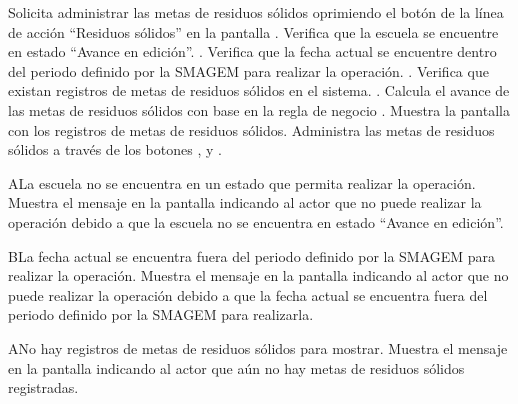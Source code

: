  \begin{UCtrayectoria}
    \UCpaso[\UCactor] Solicita administrar las metas de residuos sólidos oprimiendo el botón \botAcciones de la línea de acción ``Residuos sólidos'' en la pantalla .
    \UCpaso[\UCsist] Verifica que la escuela se encuentre en estado ``Avance en edición''. .
    \UCpaso[\UCsist] Verifica que la fecha actual se encuentre dentro del periodo definido por la SMAGEM para realizar la operación. .
    \UCpaso[\UCsist] Verifica que existan registros de metas de residuos sólidos en el sistema. .
    \UCpaso[\UCsist] Calcula el avance de las metas de residuos sólidos con base en la regla de negocio .
    \UCpaso[\UCsist] Muestra la pantalla  con los registros de metas de residuos sólidos.
    \UCpaso[\UCactor] Administra las metas de residuos sólidos a través de los botones \botMetas, \botAutoAjus y . \label{cus26:Administrar}
 \end{UCtrayectoria}
 
    \begin{UCtrayectoriaA}{A}{La escuela no se encuentra en un estado que permita realizar la operación.}
    \UCpaso[\UCsist] Muestra el mensaje  en la pantalla  indicando al actor que no puede realizar la operación debido a que la escuela no se encuentra en estado ``Avance en edición''. 
 \end{UCtrayectoriaA}
 
    \begin{UCtrayectoriaA}{B}{La fecha actual se encuentra fuera del periodo definido por la SMAGEM para realizar la operación.}
    \UCpaso[\UCsist] Muestra el mensaje  en la pantalla  indicando al actor que no puede realizar la operación debido a que la fecha actual se encuentra fuera del periodo definido por la SMAGEM para realizarla. 
 \end{UCtrayectoriaA}
 
  \begin{UCtrayectoriaA}{A}{No hay registros de metas de residuos sólidos para mostrar.}
    \UCpaso[\UCsist] Muestra el mensaje  en la pantalla  indicando al actor que aún no hay metas de residuos sólidos registradas. 
 \end{UCtrayectoriaA}
 



